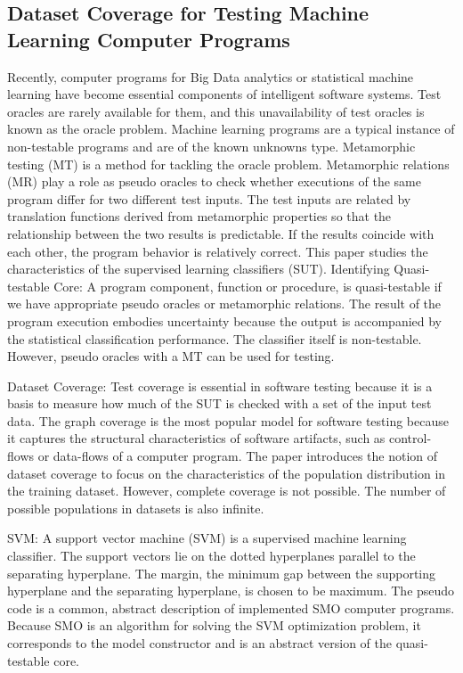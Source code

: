 \subsection{Dataset Coverage for Testing Machine Learning Computer Programs \cite{Nakajima2016}}
Recently, computer programs for Big Data analytics or statistical machine learning have become essential components of intelligent software systems. Test oracles are rarely available for them, and this unavailability of test oracles is known as the oracle problem. Machine learning programs are a typical instance of non-testable programs and are of the known unknowns type. Metamorphic testing (MT) is a method for tackling the oracle problem. Metamorphic relations (MR) play a role as pseudo oracles to check whether executions of the same program differ for two different test inputs. The test inputs are related by translation functions derived from metamorphic properties so that the relationship between the two results is predictable. If the results coincide with each other, the program behavior is relatively correct.
This paper studies the characteristics of the supervised learning classifiers (SUT).
Identifying Quasi-testable Core: A program component, function or procedure, is quasi-testable if we have appropriate pseudo oracles or metamorphic relations. The result of the program execution embodies uncertainty because the output is accompanied by the statistical classification performance. The classifier itself is non-testable. However, pseudo oracles with a MT can be used for testing.\par
Dataset Coverage: Test coverage is essential in software testing because it is a basis to measure how much of the SUT is checked with a set of the input test data. The graph coverage is the most popular model for software testing because it captures the structural characteristics of software artifacts, such as control-flows or data-flows of a computer program. The paper introduces the notion of dataset coverage to focus on the characteristics of the population distribution in the training dataset. However, complete coverage is not possible. The number of possible populations in datasets is also infinite.\par
SVM: A support vector machine (SVM)  is a supervised machine learning classifier. The support vectors lie on the dotted hyperplanes parallel to the separating hyperplane. The margin, the minimum gap between the supporting hyperplane and the separating hyperplane, is chosen to be maximum. The pseudo code is a common, abstract description of implemented SMO computer programs. Because SMO is an algorithm for solving the SVM optimization problem, it corresponds to the model constructor and is an abstract version of the quasi-testable core.\par
